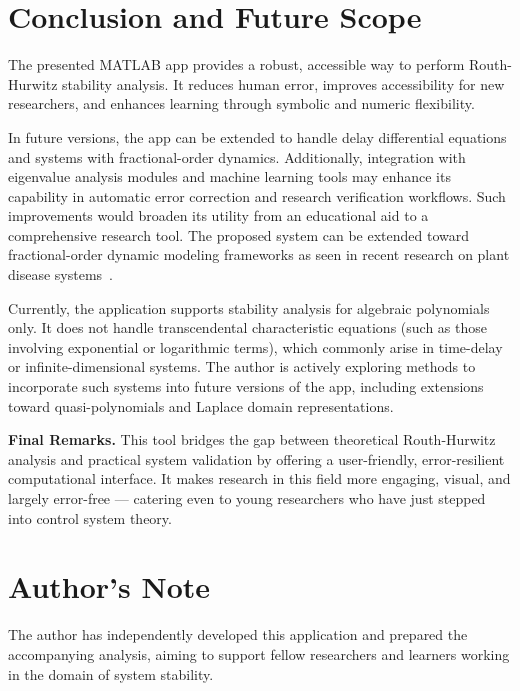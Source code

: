 \documentclass[11pt]{article}
\begin{document}
\section{Conclusion and Future Scope}
The presented MATLAB app provides a robust, accessible way to perform Routh-Hurwitz stability analysis. It reduces human error, improves accessibility for new researchers, and enhances learning through symbolic and numeric flexibility.

In future versions, the app can be extended to handle delay differential equations and systems with fractional-order dynamics. Additionally, integration with eigenvalue analysis modules and machine learning tools may enhance its capability in automatic error correction and research verification workflows. Such improvements would broaden its utility from an educational aid to a comprehensive research tool. The proposed system can be extended toward fractional-order dynamic modeling frameworks as seen in recent research on plant disease systems~\cite{paper3}.

\vspace{0.5em}
\noindent
Currently, the application supports stability analysis for algebraic polynomials only. It does not handle transcendental characteristic equations (such as those involving exponential or logarithmic terms), which commonly arise in time-delay or infinite-dimensional systems. The author is actively exploring methods to incorporate such systems into future versions of the app, including extensions toward quasi-polynomials and Laplace domain representations.

\vspace{1em}
\noindent\textbf{Final Remarks.} 
This tool bridges the gap between theoretical Routh-Hurwitz analysis and practical system validation by offering a user-friendly, error-resilient computational interface. It makes research in this field more engaging, visual, and largely error-free — catering even to young researchers who have just stepped into control system theory.

\section*{Author's Note}
The author has independently developed this application and prepared the accompanying analysis, aiming to support fellow researchers and learners working in the domain of system stability.
\end{document}

